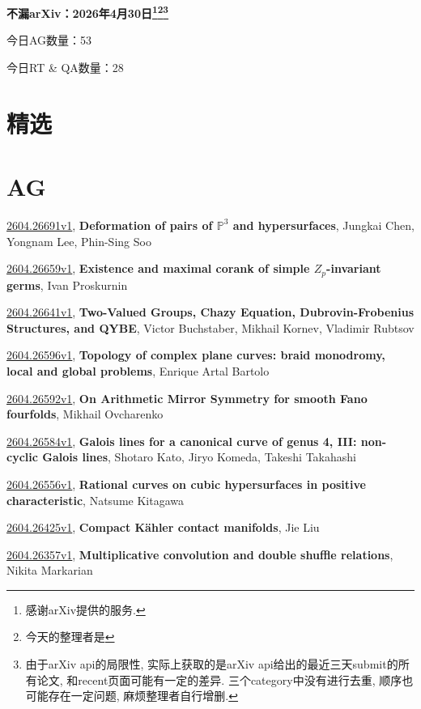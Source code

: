 \documentclass[9pt, a4paper]{article}
\theoremstyle{plain}
\theoremstyle{definition}
\theoremstyle{remark}
\newcommand{\arxiv}[3]{\href{https://arxiv.org/abs/#1}{#1}, \textbf{\textcolor{arxivblue}{#2}}, #3}
\newcommand{\AGnumber}{53}
\newcommand{\RTQAnumber}{28}
\newcommand{\NewestDate}{2026年4月30日}
\newcommand{\todayarXiver}{} %
\begin{document}
\begin{center}
    \Huge\textbf{不漏arXiv：\NewestDate\footnote{感谢arXiv提供的服务.}\footnote{今天的整理者是\todayarXiver}\footnote{由于arXiv api的局限性, 实际上获取的是arXiv api给出的最近三天submit的所有论文, 和recent页面可能有一定的差异. 三个category中没有进行去重, 顺序也可能存在一定问题, 麻烦整理者自行增删.}} \\
\end{center}

\setcounter{section}{-1}

\begin{center}
    今日AG数量：\AGnumber
    
    今日RT \& QA数量：\RTQAnumber
    
\end{center}


\section{精选}


\section{AG}
\arxiv{2604.26691v1}{Deformation of pairs of $\mathbb{P}^3$ and hypersurfaces}{Jungkai Chen, Yongnam Lee, Phin-Sing Soo}

\arxiv{2604.26659v1}{Existence and maximal corank of simple $Z_p$-invariant germs}{Ivan Proskurnin}

\arxiv{2604.26641v1}{Two-Valued Groups, Chazy Equation, Dubrovin-Frobenius Structures, and QYBE}{Victor Buchstaber, Mikhail Kornev, Vladimir Rubtsov}

\arxiv{2604.26596v1}{Topology of complex plane curves: braid monodromy, local and global problems}{Enrique Artal Bartolo}

\arxiv{2604.26592v1}{On Arithmetic Mirror Symmetry for smooth Fano fourfolds}{Mikhail Ovcharenko}

\arxiv{2604.26584v1}{Galois lines for a canonical curve of genus 4, III: non-cyclic Galois lines}{Shotaro Kato, Jiryo Komeda, Takeshi Takahashi}

\arxiv{2604.26556v1}{Rational curves on cubic hypersurfaces in positive characteristic}{Natsume Kitagawa}

\arxiv{2604.26425v1}{Compact Kähler contact manifolds}{Jie Liu}

\arxiv{2604.26357v1}{Multiplicative convolution and double shuffle relations}{Nikita Markarian}
\end{document}

